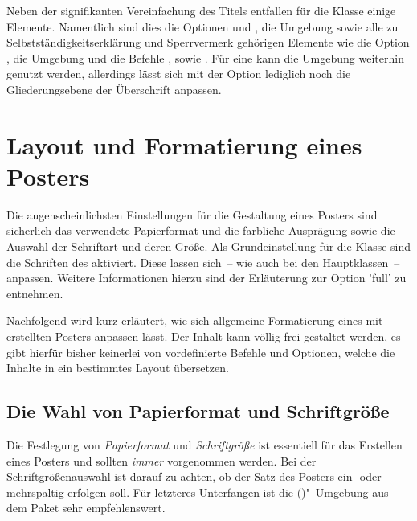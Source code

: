 \begin{DeclareEntity}{}
Neben der signifikanten Vereinfachung des Titels entfallen für die Klasse 
 einige Elemente. Namentlich sind dies die Optionen 
 und , die Umgebung 
 sowie alle zu Selbstständigkeitserklärung und 
Sperrvermerk gehörigen Elemente wie die Option , die 
Umgebung  und die Befehle , 
 sowie . Für eine \abstractname{} 
kann die Umgebung  weiterhin genutzt werden, allerdings 
lässt sich mit der Option  lediglich noch die Gliederungsebene 
der Überschrift anpassen.



\section{Layout und Formatierung eines Posters}
%
Die augenscheinlichsten Einstellungen für die Gestaltung eines Posters sind 
sicherlich das verwendete Papierformat und die farbliche Ausprägung sowie die 
Auswahl der Schriftart und deren Größe. Als Grundeinstellung für die Klasse
 sind die Schriften des \TUDCDs aktiviert. Diese lassen 
sich~-- wie auch bei den Hauptklassen~-- anpassen. Weitere Informationen hierzu 
sind der Erläuterung zur Option 'full' zu entnehmen.

Nachfolgend wird kurz erläutert, wie sich allgemeine Formatierung eines mit 
 erstellten Posters anpassen lässt. Der Inhalt kann völlig 
frei gestaltet werden, es gibt hierfür bisher keinerlei von \TUDScript 
vordefinierte Befehle und Optionen, welche die Inhalte in ein bestimmtes Layout 
übersetzen.



\subsection{%
  Die Wahl von Papierformat und Schriftgröße%
  \label{sec:fontsize}%
}
%
Die Festlegung von \emph{Papierformat} und \emph{Schriftgröße} ist essentiell 
für das Erstellen eines Posters und sollten \emph{immer} vorgenommen werden. 
Bei der Schriftgrößenauswahl ist darauf zu achten, ob der Satz des Posters 
ein- oder mehrspaltig erfolgen soll. Für letzteres Unterfangen ist die 
()"~Umgebung aus dem Paket 
 sehr empfehlenswert. 


\end{DeclareEntity}
